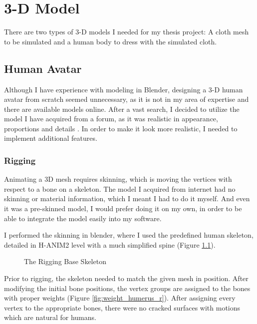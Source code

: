 \chapter{3-D Model}
\label{chapter4}

There are two types of 3-D models I needed for my thesis project: A cloth mesh to be simulated and a human body to dress with the simulated cloth.

\section{Human Avatar}
\label{section4_1}

Although I have experience with modeling in Blender, designing a 3-D human avatar from scratch seemed unnecessary, as it is not in my area of expertise and there are available models online. After a vast search, I decided to utilize the model I have acquired from a forum, as it was realistic in appearance, proportions and details \cite{Mmava2012}. In order to make it look more realistic, I needed to implement additional features.

\subsection{Rigging}

Animating a 3D mesh requires skinning, which is moving the vertices with respect to a bone on a skeleton. The model I acquired from internet had no skinning or material information, which I meant I had to do it myself. And even it was a pre-skinned model, I would prefer doing it on my own, in order to be able to integrate the model easily into my software. 

I performed the skinning in blender, where I used the predefined human skeleton, detailed in H-ANIM2 level with a much simplified spine (Figure \ref{fig:rigging_skeleton}). 

\begin{figure}[h]
\centerline{}
\caption{The Rigging Base Skeleton}
\label{fig:rigging_skeleton}
\end{figure}

Prior to rigging, the skeleton needed to match the given mesh in position. After modifying the initial bone positions, the vertex groups are assigned to the bones with proper weights (Figure \ref{fig:weight_humerus_r}). After assigning every vertex to the appropriate bones, there were no cracked surfaces with motions which are natural for humans. 

